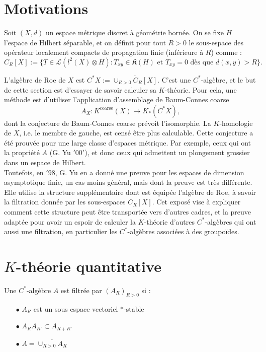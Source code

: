 \section{Motivations}

Soit $(X,d)$ un espace métrique discret à géométrie bornée. On se fixe $H$ l'espace de Hilbert séparable, et on définit pour tout $R>0$ le sous-espace des opérateur localement compacts de propagation finie (inférieure à $R$) comme :
\[C_R[X]:=\{T\in \mathcal L(l^2(X)\otimes H) : T_{xy}\in \mathfrak K(H)\text{ et } T_{xy}= 0 \text{ dès que } d(x,y)>R\}.\] 

L'algèbre de Roe de $X$ est $C^*X:=\overline{\cup_{R>0} C_R[X]}$. C'est une $C^*$-algèbre, et le but de cette section est d'essayer de savoir calculer sa $K$-théorie. Pour cela, une méthode est d'utiliser l'application d'assemblage de Baum-Connes coarse 
\[A_X : K^{\text{coarse}}(X)\rightarrow K_*(C^*X),\]
dont la conjecture de Baum-Connes coarse prévoit l'isomorphie. La $K$-homologie de $X$, i.e. le membre de gauche, est censé être plus calculable. Cette conjecture a été prouvée pour une large classe d'espaces métrique. Par exemple, ceux qui ont la propriété $A$ (G. Yu $'00'$), et donc ceux qui admettent un plongement grossier dans un espace de Hilbert.\\

 Toutefois, en $'98$, G. Yu en a donné une preuve pour les espaces de dimension asymptotique finie, un cas moins général, mais dont la preuve est très différente. Elle utilise la structure supplémentaire dont est équipée l'algèbre de Roe, à savoir la filtration donnée par les sous-espaces $C_R[X]$. Cet exposé vise à expliquer comment cette structure peut être transportée vers d'autres cadres, et la preuve adaptée pour avoir un espoir de calculer la $K$-théorie d'autres $C^*$-algèbres qui ont aussi une filtration, en particulier les $C^*$-algèbres associées à des groupoïdes.

\section{$K$-théorie quantitative}

\begin{definition}
Une $C^*$-algèbre $A$ est filtrée par $(A_R)_{R>0}$ si :
\begin{itemize}
\item[$\bullet$] $A_R$ est un sous espace vectoriel $*$-stable
\item[$\bullet$] $A_R A_{R'}\subset A_{R+R'}$
\item[$\bullet$] $A=\overline{\cup_{R>0} A_R}$
\end{itemize}
\end{definition}

